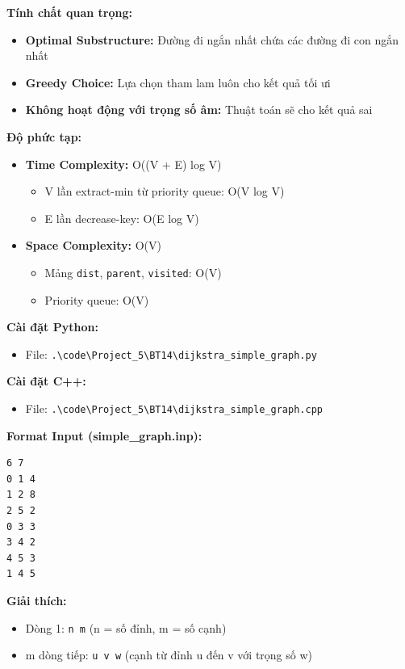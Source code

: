 \documentclass[12pt,a4paper]{article}
\begin{document}
\textbf{Tính chất quan trọng:}
\begin{itemize}[label=\textbullet]
   \item \textbf{Optimal Substructure:} Đường đi ngắn nhất chứa các đường đi con ngắn nhất
   \item \textbf{Greedy Choice:} Lựa chọn tham lam luôn cho kết quả tối ưi
   \item \textbf{Không hoạt động với trọng số âm:} Thuật toán sẽ cho kết quả sai
\end{itemize}

\textbf{Độ phức tạp:}
\begin{itemize}[label=\textbullet]
   \item \textbf{Time Complexity:} O((V + E) log V)
   \begin{itemize}[label=\textendash]
       \item V lần extract-min từ priority queue: O(V log V)
       \item E lần decrease-key: O(E log V)
   \end{itemize}
   \item \textbf{Space Complexity:} O(V)
   \begin{itemize}[label=\textendash]
       \item Mảng \texttt{dist}, \texttt{parent}, \texttt{visited}: O(V)
       \item Priority queue: O(V)
   \end{itemize}
\end{itemize}

\textbf{Cài đặt Python:}
\begin{itemize}[label=\textbullet]
   \item File: \texttt{.\textbackslash code\textbackslash Project\_5\textbackslash BT14\textbackslash dijkstra\_simple\_graph.py}
\end{itemize}

\textbf{Cài đặt C++:}
\begin{itemize}[label=\textbullet]
   \item File: \texttt{.\textbackslash code\textbackslash Project\_5\textbackslash BT14\textbackslash dijkstra\_simple\_graph.cpp}
\end{itemize}
\newpage
\textbf{Format Input (simple\_graph.inp):}
\begin{verbatim}
6 7
0 1 4
1 2 8
2 5 2
0 3 3
3 4 2
4 5 3
1 4 5
\end{verbatim}

\textbf{Giải thích:}
\begin{itemize}[label=\textbullet]
   \item Dòng 1: \texttt{n m} (n = số đỉnh, m = số cạnh)
   \item m dòng tiếp: \texttt{u v w} (cạnh từ đỉnh u đến v với trọng số w)
\end{itemize}
\end{document}
